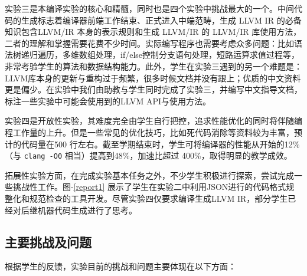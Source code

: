 \documentclass{SCIS2020cn}
\begin{document}
实验三是本编译实验的核心和精髓，同时也是四个实验中挑战最大的一个。中间代码的生成标志着编译器前端工作结束、正式进入中端范畴，生成 LLVM IR 的必备知识包含LLVM/IR 本身\cite{llvm_manual}的表示规则和生成 LLVM/IR 的 LLVM/IR 库使用方法，二者的理解和掌握需要花费不少时间。实际编写程序也需要考虑众多问题：比如语法树递归遍历，多维数组处理，if/else控制分支语句处理，短路运算求值过程等，非常考验学生的算法和数据结构能力。此外，学生在实验三遇到的另一个难题是：LLVM库本身的更新与重构过于频繁，很多时候文档并没有跟上；优质的中文资料更是偏少。在实验中我们由助教与学生同时完成了实验三，并编写中文指导文档，标注一些实验中可能会使用到的LLVM API与使用方法。%


实验四是开放性实验，其难度完全由学生自行把控，追求性能优化的同时将伴随编程工作量的上升。但是一些常见的优化技巧，比如死代码消除等资料较为丰富，预计的代码量在500 行左右。截至学期结束时，学生可将编译器的性能从开始的12\%（与 \texttt{clang -O0} 相当）提高到48\%，加速比超过 400\%，取得明显的教学成效。

拓展性实验方面，在完成实验基本任务之外，不少学生积极进行探索，尝试完成一些挑战性工作。图-\ref{report1} 展示了学生在实验二中利用JSON进行的代码格式规整化和规范检查的工具开发。尽管实验四仅要求编译生成LLVM IR，部分学生已经对后继机器代码生成进行了思考。

\subsection{主要挑战及问题}
根据学生的反馈，实验目前的挑战和问题主要体现在以下方面：
\end{document}
